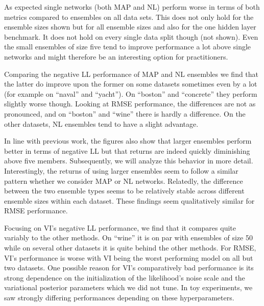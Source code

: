 \documentclass[../thesis.tex]{subfiles}
\begin{document}
As expected single networks (both MAP and NL) perform worse in terms of both metrics compared to ensembles on all data sets. This does not only hold for the ensemble sizes shown but for all ensemble sizes and also for the one hidden layer benchmark. It does not hold on every single data split though (not shown). Even the small ensembles of size five tend to improve performance a lot above single networks and might therefore be an interesting option for practitioners.

Comparing the negative LL performance of MAP and NL ensembles we find that the latter do improve upon the former on some datasets sometimes even by a lot (for example on ``naval'' and ``yacht''). On ``boston'' and ``concrete'' they perform slightly worse though. Looking at RMSE performance, the differences are not as pronounced, and on ``boston'' and ``wine'' there is hardly a difference. On the other datasets, NL ensembles tend to have a slight advantage.

In line with previous work, the figures also show that larger ensembles perform better in terms of negative LL but that returns are indeed quickly diminishing above five members. Subsequently, we will analyze this behavior in more detail. Interestingly, the returns of using larger ensembles seem to follow a similar pattern whether we consider MAP or NL networks. Relatedly, the difference between the two ensemble types seems to be relatively stable across different ensemble sizes within each dataset. These findings seem qualitatively similar for RMSE performance.

Focusing on VI's negative LL performance, we find that it compares quite variably to the other methods. On ``wine'' it is on par with ensembles of size 50 while on several other datasets it is quite behind the other methods. For RMSE, VI's performance is worse with VI being the worst performing model on all but two datasets. One possible reason for VI's comparatively bad performance is its strong dependence on the initialization of the likelihood's noise scale and the variational posterior parameters which we did not tune. In toy experiments, we saw strongly differing performances depending on these hyperparameters. 
\end{document}
